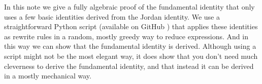 \documentclass{article}
\begin{document}
In this note we give a fully algebraic proof of the fundamental identity that only uses a few basic identities derived from the Jordan identity. We use a straightforward Python script (available on GitHub \cite{sourcecode}) that applies these identities as rewrite rules in a random, mostly greedy way to reduce expressions. And in this way we can show that the fundamental identity is derived. Although using a script might not be the most elegant way, it does show that you don't need much cleverness to derive the fundamental identity, and that instead it can be derived in a mostly mechanical way.

\end{document}
